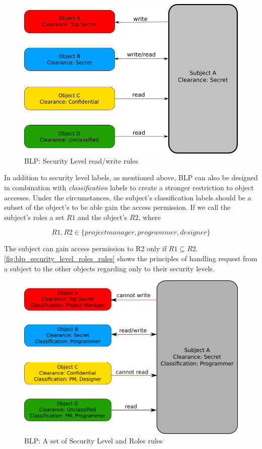 \begin{figure}[bth]
\myfloatalign
\includegraphics[width=1.0\linewidth]{gfx/chapter_2/blp_security_level_rules}
\caption[BLP: Security Level rules]{BLP: Security Level read/write rules}
\label{fig:blp_security_level_rules}
\end{figure}

In addition to security level labels, as mentioned above, BLP can also be designed in combination with \emph{classification} labels to create a stronger restriction to object accesses.
Under the circumstances, the subject's classification labels should be a subset of the object's to be able gain the access permission.
If we call the subject's roles a set $R1$ and the object's $R2$, where

$$R1, R2 \in \{project manager, programmer, designer\}$$ 

The subject can gain access permission to R2 only if $R1 \subseteq R2$.
\autoref{fig:blp_security_level_roles_rules} shows the principles of handling request from a subject to the other objects regarding only to their security levels.

\begin{figure}[bth]
\myfloatalign
\includegraphics[width=1.0\linewidth]{gfx/chapter_2/blp_security_level_roles_rules}
\caption[BLP: A set of Security Level and Roles rules]{BLP: A set of Security Level and Roles rules}
\label{fig:blp_security_level_roles_rules}
\end{figure}

